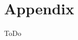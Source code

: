 \setcounter{section}{0}
\renewcommand*\theHsection{\Alph{section}}
\renewcommand*\thesection{\Alph{section}}


\section{Appendix}
\label{sec:appendix}

ToDo